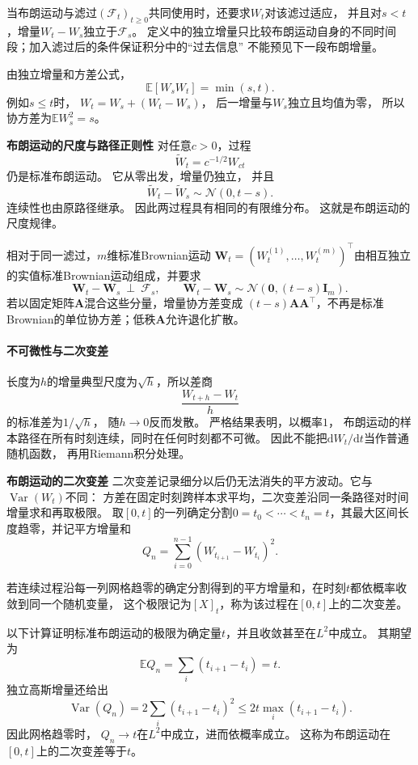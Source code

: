 当布朗运动与滤过$(\mathcal{F}_t)_{t\geq0}$共同使用时，还要求$W_t$对该滤过适应，
并且对$s<t$，增量$W_t-W_s$独立于$\mathcal{F}_s$。
定义中的独立增量只比较布朗运动自身的不同时间段；加入滤过后的条件保证积分中的“过去信息”
不能预见下一段布朗增量。

由独立增量和方差公式，
\begin{equation}
	\mathbb{E}[W_{s}W_{t}]=\min(s,t). \label{eq:dynamical-brownian-covariance}
\end{equation}
例如$s\leq t$时， $W_{t}=W_{s}+(W_{t}-W_{s})$， 后一增量与$W_{s}$独立且均值为零，
所以协方差为$\mathbb{E}W_{s}^{2}=s$。

\par\medskip\noindent\textbf{布朗运动的尺度与路径正则性}\quad
对任意$c>0$，过程
\[
	\widetilde W_{t}= c^{-1/2}W_{ct}
\]
仍是标准布朗运动。 它从零出发，增量仍独立， 并且
\[
	\widetilde W_{t}-\widetilde W_{s}\sim \mathcal{N}(0,t-s).
\]
连续性也由原路径继承。 因此两过程具有相同的有限维分布。
这就是布朗运动的尺度规律。

相对于同一滤过，\(m\)维标准Brownian运动
\(\bm W_t=(W_t^{(1)},\ldots,W_t^{(m)})^\top\)由相互独立的实值标准Brownian运动组成，并要求
\[
\bm W_t-\bm W_s\ \perp\ \mathcal F_s,\qquad
\bm W_t-\bm W_s\sim\mathcal N(\bm0,(t-s)\bm I_m).
\]
若以固定矩阵\(\bm A\)混合这些分量，增量协方差变成
\((t-s)\bm A\bm A^\top\)，不再是标准Brownian的单位协方差；低秩\(\bm A\)允许退化扩散。

\paragraph{不可微性与二次变差}
长度为\(h\)的增量典型尺度为\(\sqrt h\)，所以差商
\[
	\frac{W_{t+h}-W_{t}}{h}
\]
的标准差为$1/\sqrt{h}$， 随$h\to0$反而发散。 严格结果表明，以概率$1$，
布朗运动的样本路径在所有时刻连续，同时在任何时刻都不可微。
因此不能把$\mathrm{d}W_{t}/\mathrm{d}t$当作普通随机函数， 再用Riemann积分处理。

\par\medskip\noindent\textbf{布朗运动的二次变差}\quad
二次变差记录细分以后仍无法消失的平方波动。它与$\operatorname{Var}(W_t)$不同：
方差在固定时刻跨样本求平均，二次变差沿同一条路径对时间增量求和再取极限。
取$[0,t]$的一列确定分割$0=t_0<\cdots<t_n=t$，其最大区间长度趋零，并记平方增量和
\[
	Q_{n}= \sum_{i=0}^{n-1}(W_{t_{i+1}}-W_{t_i})^{2}.
\]
\begin{definition}[沿确定分割的二次变差]
\label{def:dynamical-quadratic-variation}
若连续过程沿每一列网格趋零的确定分割得到的平方增量和，在时刻$t$都依概率收敛到同一个随机变量，
这个极限记为$[X]_t$，称为该过程在$[0,t]$上的二次变差。
\end{definition}
以下计算证明标准布朗运动的极限为确定量$t$，并且收敛甚至在$L^2$中成立。
其期望为
\[
	\mathbb{E}Q_{n}= \sum_{i}(t_{i+1}-t_{i})=t.
\]
独立高斯增量还给出
\[
	\operatorname{Var}(Q_{n}) = 2\sum_{i}(t_{i+1}-t_{i})^{2}\leq 2t\max_{i}(t_{i+1}
	-t_{i}).
\]
因此网格趋零时， $Q_{n}\to t$在$L^{2}$中成立，进而依概率成立。 这称为布朗运动在$[
0,t]$上的二次变差等于$t$。

